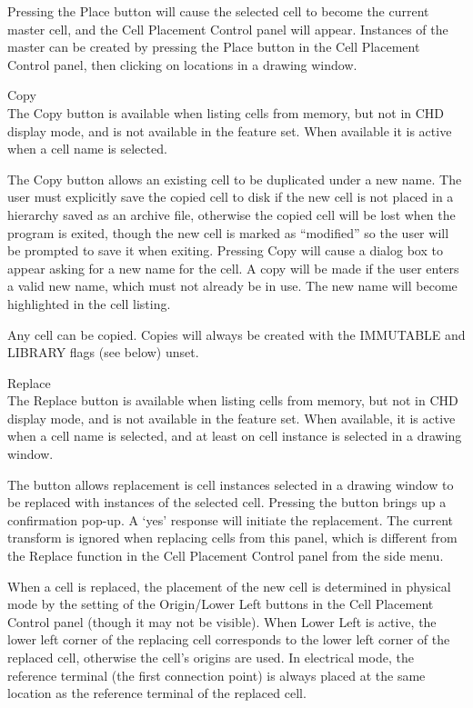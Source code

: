 \begin{description}
Pressing the {\cb Place} button will cause the selected cell to
become the current master cell, and the {\cb Cell Placement Control}
panel will appear.  Instances of the master can be created by pressing
the {\cb Place} button in the {\cb Cell Placement Control} panel, then
clicking on locations in a drawing window.

\item{\cb Copy}\\
The {\cb Copy} button is available when listing cells from memory, but
not in CHD display mode, and is not available in the {\Xiv} feature
set.  When available it is active when a cell name is selected.

The {\cb Copy} button allows an existing cell to be duplicated under a
new name.  The user must explicitly save the copied cell to disk if
the new cell is not placed in a hierarchy saved as an archive file,
otherwise the copied cell will be lost when the program is exited,
though the new cell is marked as ``modified'' so the user will be
prompted to save it when exiting.  Pressing {\cb Copy} will cause a
dialog box to appear asking for a new name for the cell.  A copy will
be made if the user enters a valid new name, which must not already be
in use.  The new name will become highlighted in the cell listing. 

Any cell can be copied.  Copies will always be created with the
IMMUTABLE and LIBRARY flags (see below) unset.

\item{\cb Replace}\\
The {\cb Replace} button is available when listing cells from memory,
but not in CHD display mode, and is not available in the {\Xiv}
feature set.  When available, it is active when a cell name is
selected, and at least on cell instance is selected in a drawing
window.

The button allows replacement is cell instances selected in a drawing
window to be replaced with instances of the selected cell.  Pressing
the button brings up a confirmation pop-up.  A `yes' response will
initiate the replacement.  The current transform is ignored when
replacing cells from this panel, which is different from the {\cb
Replace} function in the {\cb Cell Placement Control} panel from the
side menu.

When a cell is replaced, the placement of the new cell is determined
in physical mode by the setting of the {\cb Origin}/{\cb Lower Left}
buttons in the {\cb Cell Placement Control} panel (though it may not
be visible).  When {\cb Lower Left} is active, the lower left corner
of the replacing cell corresponds to the lower left corner of the
replaced cell, otherwise the cell's origins are used.  In electrical
mode, the reference terminal (the first connection point) is always
placed at the same location as the reference terminal of the replaced
cell.


\end{description}
